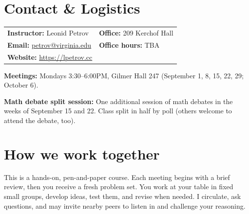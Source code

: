 \documentclass[oneside,11pt]{amsart}
\begin{document}
\newpage
\section{Contact \& Logistics}

\noindent
\begin{tabular}{ll}
\textbf{Instructor:} Leonid Petrov &\qquad \qquad \qquad\textbf{Office:} 209 Kerchof Hall \\
\textbf{Email:} \href{mailto:petrov@virginia.edu}{petrov@virginia.edu} & \qquad \qquad \qquad\textbf{Office hours:} TBA \\
\textbf{Website:} \url{https://lpetrov.cc}
\end{tabular}

\vspace{4pt}

\noindent\textbf{Meetings:} 
Mondays 3:30--6:00PM, Gilmer Hall 247
(September 1, 8, 15, 22, 29; October 6).

\medskip
\noindent
\textbf{Math debate split session:} One additional session of math debates in the weeks of September 15 and 22. 
Class split in half by poll (others welcome to attend the debate, too).

\section{How we work together}

This is a hands-on, pen-and-paper course. Each meeting begins with 
a brief review, then you receive
a fresh problem set. You work at your table in fixed small groups, develop ideas, test them, and revise when needed. I circulate, ask questions, and may invite nearby peers to listen in and challenge your reasoning.
\end{document}
